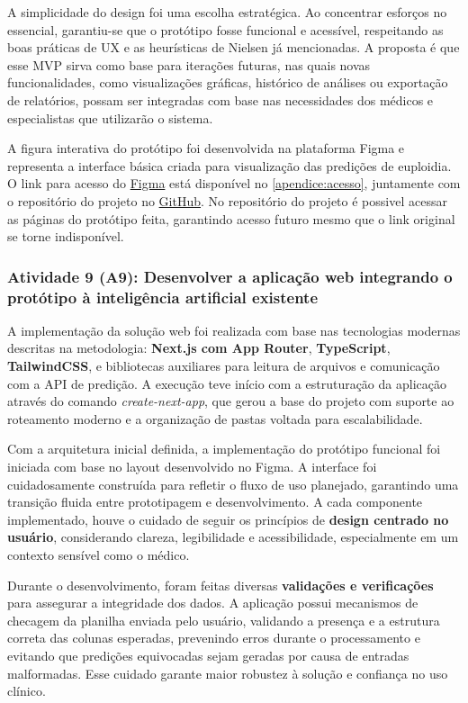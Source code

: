 A simplicidade do design foi uma escolha estratégica. Ao concentrar esforços no essencial, garantiu-se que o protótipo fosse funcional e acessível, respeitando as boas práticas de UX e as heurísticas de Nielsen já mencionadas. A proposta é que esse MVP sirva como base para iterações futuras, nas quais novas funcionalidades, como visualizações gráficas, histórico de análises ou exportação de relatórios, possam ser integradas com base nas necessidades dos médicos e especialistas que utilizarão o sistema.

A figura interativa do protótipo foi desenvolvida na plataforma Figma e representa a interface básica criada para visualização das predições de euploidia. O link para acesso do \href{https://www.figma.com/design/0AstYynXwZO9zVudP1NimJ/Predi%C3%A7%C3%A3o-de-Ploidia}{Figma} está disponível no \autoref{apendice:acesso}, juntamente com o repositório do projeto no \href{https://github.com/sabrinaberno/embryo-predictor}{GitHub}. No repositório do projeto é possivel acessar as páginas do protótipo feita, garantindo acesso futuro mesmo que o link original se torne indisponível.

\subsubsection{Atividade 9 (A9):  Desenvolver a aplicação web integrando o protótipo à inteligência artificial existente}
A implementação da solução web foi realizada com base nas tecnologias modernas descritas na metodologia: \textbf{Next.js com App Router}, \textbf{TypeScript}, \textbf{TailwindCSS}, e bibliotecas auxiliares para leitura de arquivos e comunicação com a API de predição. A execução teve início com a estruturação da aplicação através do comando \textit{create-next-app}, que gerou a base do projeto com suporte ao roteamento moderno e a organização de pastas voltada para escalabilidade.

Com a arquitetura inicial definida, a implementação do protótipo funcional foi iniciada com base no layout desenvolvido no Figma. A interface foi cuidadosamente construída para refletir o fluxo de uso planejado, garantindo uma transição fluida entre prototipagem e desenvolvimento. A cada componente implementado, houve o cuidado de seguir os princípios de \textbf{design centrado no usuário}, considerando clareza, legibilidade e acessibilidade, especialmente em um contexto sensível como o médico.

Durante o desenvolvimento, foram feitas diversas \textbf{validações e verificações} para assegurar a integridade dos dados. A aplicação possui mecanismos de checagem da planilha enviada pelo usuário, validando a presença e a estrutura correta das colunas esperadas, prevenindo erros durante o processamento e evitando que predições equivocadas sejam geradas por causa de entradas malformadas. Esse cuidado garante maior robustez à solução e confiança no uso clínico.

